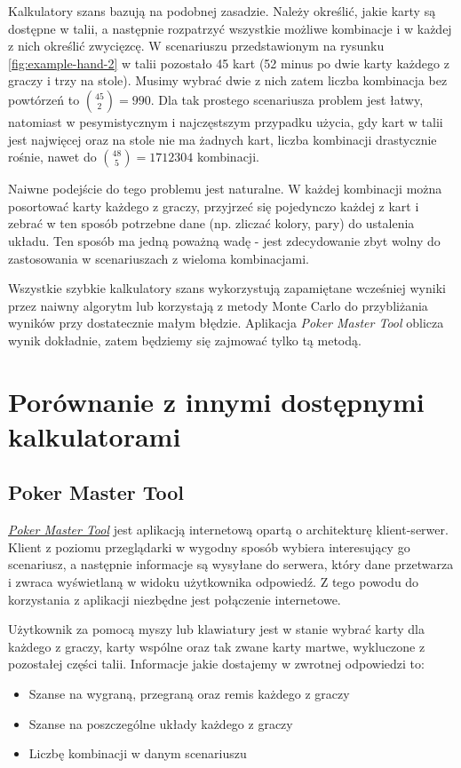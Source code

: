 Kalkulatory szans bazują na podobnej zasadzie. Należy określić, jakie karty są dostępne w talii, a następnie rozpatrzyć wszystkie możliwe kombinacje i w każdej z nich określić zwycięzcę. W scenariuszu przedstawionym na rysunku \ref{fig:example-hand-2} w talii pozostało 45 kart (52 minus po dwie karty każdego z graczy i trzy na stole). Musimy wybrać dwie z nich zatem liczba kombinacja bez powtórzeń to $\binom{45}{2}= 990$. Dla tak prostego scenariusza problem jest łatwy, natomiast w pesymistycznym i najczęstszym przypadku użycia, gdy kart w talii jest najwięcej oraz na stole nie ma żadnych kart, liczba kombinacji drastycznie rośnie, nawet do $\binom{48}{5}= 1712304$ kombinacji.

Naiwne podejście do tego problemu jest naturalne. W każdej kombinacji można posortować karty każdego z graczy, przyjrzeć się pojedynczo każdej z kart i zebrać w ten sposób potrzebne dane (np. zliczać kolory, pary) do ustalenia układu. Ten sposób ma jedną poważną wadę - jest zdecydowanie zbyt wolny do zastosowania w scenariuszach z wieloma kombinacjami. 

Wszystkie szybkie kalkulatory szans wykorzystują zapamiętane wcześniej wyniki przez naiwny algorytm lub korzystają z metody Monte Carlo \cite{monte-carlo} \cite{monte-carlo-presentation} do przybliżania wyników przy dostatecznie małym błędzie. Aplikacja  \emph{Poker Master Tool} oblicza wynik dokładnie, zatem będziemy się zajmować tylko tą metodą.

\section{Porównanie z innymi dostępnymi kalkulatorami}

\subsection{Poker Master Tool}

\href{https://pokermastertool.bartoszputek.pl/}{\emph{Poker Master Tool}} jest aplikacją internetową opartą o architekturę klient-serwer. Klient z poziomu przeglądarki w wygodny sposób wybiera interesujący go scenariusz, a następnie informacje są wysyłane do serwera, który dane przetwarza i zwraca wyświetlaną w widoku użytkownika odpowiedź. Z tego powodu do korzystania z aplikacji niezbędne jest połączenie internetowe. 

Użytkownik za pomocą myszy lub klawiatury jest w stanie wybrać karty dla każdego z graczy, karty wspólne oraz tak zwane karty martwe, wykluczone z pozostałej części talii. Informacje jakie dostajemy w zwrotnej odpowiedzi to:
\begin{itemize}
    \item Szanse na wygraną, przegraną oraz remis każdego z graczy
    \item Szanse na poszczególne układy każdego z graczy
    \item Liczbę kombinacji w danym scenariuszu
\end{itemize}

